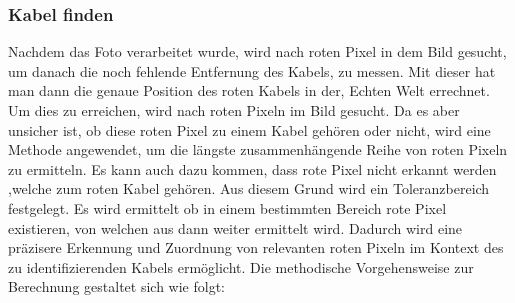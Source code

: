 \subsubsection{Kabel finden}
Nachdem das Foto verarbeitet wurde, wird nach roten Pixel in dem Bild gesucht, um danach die noch fehlende Entfernung des Kabels, zu messen. Mit dieser hat man dann die genaue Position des roten Kabels in der, Echten Welt errechnet. Um dies zu erreichen, wird nach roten Pixeln im Bild gesucht. Da es aber unsicher ist, ob diese roten Pixel zu einem Kabel gehören oder nicht, wird eine Methode angewendet, um die längste zusammenhängende Reihe von roten Pixeln zu ermitteln. Es kann auch dazu kommen, dass rote Pixel nicht erkannt werden ,welche zum roten Kabel gehören. Aus diesem Grund wird ein Toleranzbereich festgelegt. Es wird ermittelt ob in einem bestimmten Bereich rote Pixel existieren, von welchen aus dann weiter ermittelt wird. Dadurch wird eine präzisere Erkennung und Zuordnung von relevanten roten Pixeln im Kontext des zu identifizierenden Kabels ermöglicht. Die methodische Vorgehensweise zur Berechnung gestaltet sich wie folgt:

